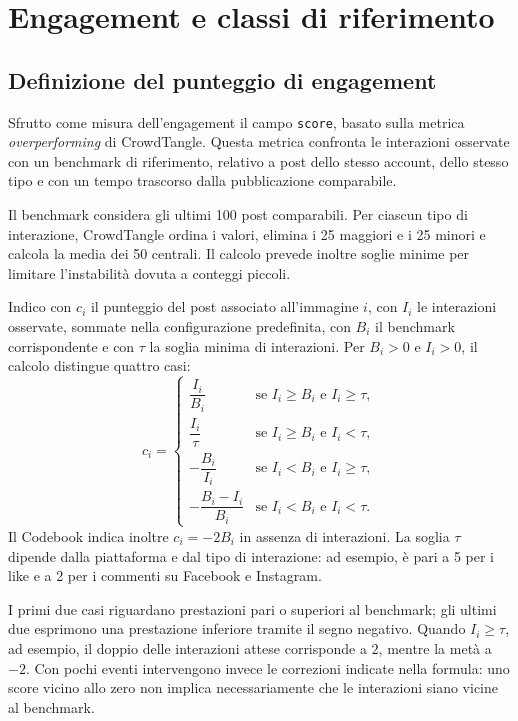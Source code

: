 \section{Engagement e classi di riferimento}
\label{sec:pipeline-engagement}

\subsection{Definizione del punteggio di engagement}
\label{subsec:dataset-engagement}

Sfrutto come misura dell'engagement il campo \texttt{score}, basato sulla metrica \emph{overperforming} di CrowdTangle. Questa metrica confronta le interazioni osservate con un benchmark di riferimento, relativo a post dello stesso account, dello stesso tipo e con un tempo trascorso dalla pubblicazione comparabile.

Il benchmark considera gli ultimi 100 post comparabili. Per ciascun tipo di interazione, CrowdTangle ordina i valori, elimina i 25 maggiori e i 25 minori e calcola la media dei 50 centrali. Il calcolo prevede inoltre soglie minime per limitare l'instabilità dovuta a conteggi piccoli.

Indico con $c_i$ il punteggio del post associato all'immagine $i$, con $I_i$ le interazioni osservate, sommate nella configurazione predefinita, con $B_i$ il benchmark corrispondente e con $\tau$ la soglia minima di interazioni. Per $B_i>0$ e $I_i>0$, il calcolo distingue quattro casi:
\begin{equation}
    c_i =
    \begin{cases}
        \dfrac{I_i}{B_i} & \text{se } I_i \geq B_i \text{ e } I_i \geq \tau, \\[6pt]
        \dfrac{I_i}{\tau} & \text{se } I_i \geq B_i \text{ e } I_i < \tau, \\[6pt]
        -\dfrac{B_i}{I_i} & \text{se } I_i < B_i \text{ e } I_i \geq \tau, \\[6pt]
        -\dfrac{B_i-I_i}{B_i} & \text{se } I_i < B_i \text{ e } I_i < \tau.
    \end{cases}
    \label{eq:dataset-overperforming}
\end{equation}
Il Codebook indica inoltre $c_i=-2B_i$ in assenza di interazioni. La soglia $\tau$ dipende dalla piattaforma e dal tipo di interazione: ad esempio, è pari a 5 per i like e a 2 per i commenti su Facebook e Instagram.

I primi due casi riguardano prestazioni pari o superiori al benchmark; gli ultimi due esprimono una prestazione inferiore tramite il segno negativo. Quando $I_i\geq\tau$, ad esempio, il doppio delle interazioni attese corrisponde a $2$, mentre la metà a $-2$. Con pochi eventi intervengono invece le correzioni indicate nella formula: uno score vicino allo zero non implica necessariamente che le interazioni siano vicine al benchmark.

